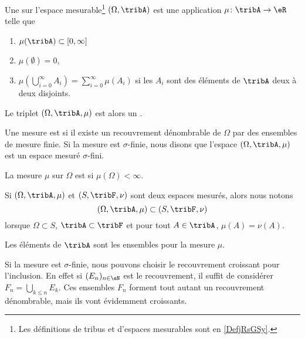 \begin{definition}  \label{DefBTsgznn}
	Une  sur l'espace mesurable\footnote{Les définitions de tribus et d'espaces mesurables sont en \ref{DefjRsGSy}.} \( (\Omega,\tribA)\) est une application \( \mu\colon \tribA\to \eR\) telle que
	\begin{enumerate}
		\item
		      \( \mu(\tribA)\subset \mathopen[ 0 , \infty \mathclose]\)
		\item
		      \( \mu(\emptyset)=0\),
		\item       \label{ItemQFjtOjXiii}
		      \( \mu\left( \bigcup_{i=0}^{\infty}A_i\right)=\sum_{i=0}^{\infty}\mu(A_i)\) si les \( A_i\) sont des éléments de \( \tribA\) deux à deux disjoints.
	\end{enumerate}
	Le triplet \( (\Omega,\tribA,\mu)\) est alors un .

	Une mesure est  si il existe un recouvrement dénombrable de \( \Omega\) par des ensembles de mesure finie. Si la mesure est \( \sigma\)-finie, nous disons que l'espace \( (\Omega,\tribA,\mu)\) est un espace mesuré \( \sigma\)-fini.

	La mesure \( \mu\) sur \( \Omega\) est  si \( \mu(\Omega)<\infty\).
\end{definition}

Si \( (\Omega,\tribA,\mu)\) et \( (S,\tribF,\nu)\) sont deux espaces mesurés, alors nous notons
\begin{equation}
	(\Omega,\tribA,\mu)\subset (S,\tribF,\nu)
\end{equation}
lorsque \( \Omega\subset S\), \( \tribA\subset\tribF\) et pour tout \( A\in\tribA\), \( \mu(A)=\nu(A)\).

\begin{definition}\label{DefHGsQxHB}
	Les éléments de \( \tribA\) sont les ensembles  pour la mesure \( \mu\).
\end{definition}

Si la mesure est \( \sigma\)-finie, nous pouvons choisir le recouvrement croissant pour l'inclusion. En effet si \( (E_n)_{n\in \eN}\) est le recouvrement, il suffit de considérer \( F_n=\bigcup_{k\leq n}E_k\). Ces ensembles \( F_n\) forment tout autant un recouvrement dénombrable, mais ils vont évidemment croissants.

